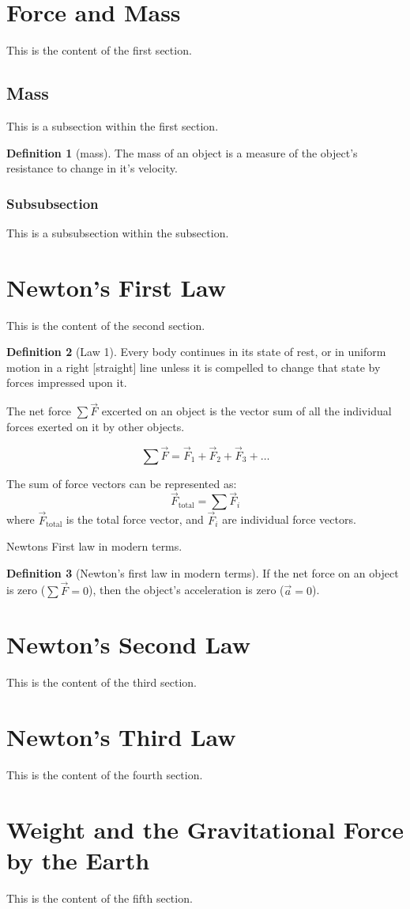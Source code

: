 \documentclass{article}
\theoremstyle{definition} %
\newtheorem{definition}{Definition}[section] %
\begin{document}
    \section{Force and Mass}
    This is the content of the first section.

    \subsection{Mass}
    This is a subsection within the first section.

    \begin{definition}[mass]
        The mass of an object is a measure of the object's resistance to change in it's velocity.
    \end{definition}

    \subsubsection{Subsubsection}
    This is a subsubsection within the subsection.

    \section{Newton's First Law}
    This is the content of the second section.

    \begin{definition}[Law 1]
        Every body continues in its state of rest, or in uniform motion in a right [straight] line unless it is compelled to change that state by forces impressed upon it.
    \end{definition}

    The net force $\sum \vec{F}$ excerted on an object is the vector sum of all the individual forces exerted on it by other objects.

    \begin{equation}
        \sum \vec{F} = \vec{F}_1 +\vec{F}_2 + \vec{F}_3 + \dots \label{eq:Net_Force}
    \end{equation}


    The sum of force vectors can be represented as:
    \[
        \vec{F}_{\text{total}} = \sum \vec{F}_i
    \]
    where $\vec{F}_{\text{total}}$ is the total force vector, and $\vec{F}_i$ are individual force vectors.


    Newtons First law in modern terms.

    \begin{definition}[Newton's first law in modern terms]
        If the net force on an object is zero ($\sum \vec{F} = 0$), then the object's acceleration is zero ($\vec{a} = 0$).
    \end{definition}

    \section{Newton's Second Law}
    This is the content of the third section.

    \section{Newton's Third Law}
    This is the content of the fourth section.

    \section{Weight and the Gravitational Force by the Earth}
    This is the content of the fifth section.
\end{document}
